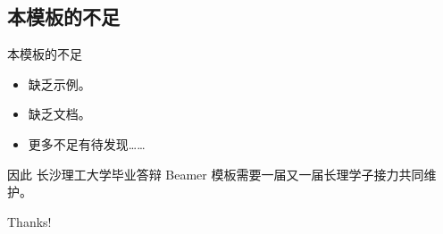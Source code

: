 \documentclass[dvipsnames, svgnames, x11names]{beamer}
\begin{document}
\subsection{本模板的不足}
\begin{frame}{本模板的不足}
    \begin{itemize}[<+->]
        \item 缺乏示例。
        \item 缺乏文档。
        \item 更多不足有待发现……
    \end{itemize}

    \onslide<+-> 因此 长沙理工大学毕业答辩 Beamer 模板需要一届又一届长理学子接力共同维护。
\end{frame}

\begin{frame}[plain]
    \begin{center}
        {\Huge Thanks!}
    \end{center}
\end{frame}
\end{document}
